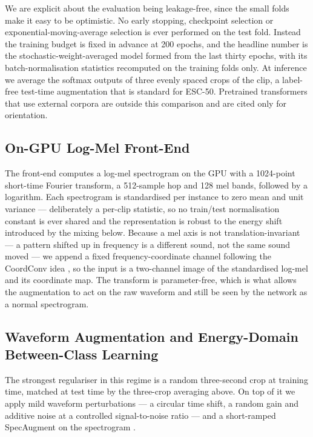 \documentclass[conference]{IEEEtran}
\begin{document}
We are explicit about the evaluation being leakage-free, since the small folds make it easy to be optimistic. No early stopping, checkpoint selection or exponential-moving-average selection is ever performed on the test fold. Instead the training budget is fixed in advance at 200 epochs, and the headline number is the stochastic-weight-averaged model \cite{izmailov_swa} formed from the last thirty epochs, with its batch-normalisation statistics recomputed on the training folds only. At inference we average the softmax outputs of three evenly spaced crops of the clip, a label-free test-time augmentation that is standard for ESC-50. Pretrained transformers that use external corpora are outside this comparison and are cited only for orientation.

\subsection{On-GPU Log-Mel Front-End}
The front-end computes a log-mel spectrogram on the GPU with a 1024-point short-time Fourier transform, a 512-sample hop and 128 mel bands, followed by a logarithm. Each spectrogram is standardised per instance to zero mean and unit variance --- deliberately a per-clip statistic, so no train/test normalisation constant is ever shared and the representation is robust to the energy shift introduced by the mixing below. Because a mel axis is not translation-invariant --- a pattern shifted up in frequency is a different sound, not the same sound moved --- we append a fixed frequency-coordinate channel following the CoordConv idea \cite{liu_coordconv}, so the input is a two-channel image of the standardised log-mel and its coordinate map. The transform is parameter-free, which is what allows the augmentation to act on the raw waveform and still be seen by the network as a normal spectrogram.

\subsection{Waveform Augmentation and Energy-Domain Between-Class Learning}\label{sec:aug}
The strongest regulariser in this regime is a random three-second crop at training time, matched at test time by the three-crop averaging above. On top of it we apply mild waveform perturbations --- a circular time shift, a random gain and additive noise at a controlled signal-to-noise ratio --- and a short-ramped SpecAugment on the spectrogram \cite{park_specaugment}.
\end{document}
